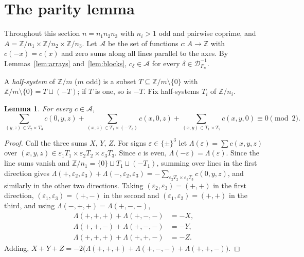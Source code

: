 \documentclass[11pt]{amsart}
\newcommand{\Z}{\mathbb{Z}}
\newcommand{\cod}[1]{\mathcal{D}_{#1}^{-1}}
\theoremstyle{plain}
\newtheorem{lemma}[theorem]{Lemma}
\theoremstyle{definition}
\begin{document}
\section{The parity lemma}\label{sec:parity}

Throughout this section $n = n_1 n_2 n_3$ with $n_i > 1$ odd and pairwise coprime, and
$A = \Z/n_1 \times \Z/n_2 \times \Z/n_3$. Let $\mathcal{A}$ be the set of functions
$c\colon A \to \Z$ with $c(-x) = c(x)$ and zero sums along all lines parallel to the axes. By
Lemmas~\ref{lem:arrays} and~\ref{lem:blocks}, $c_\delta \in \mathcal{A}$ for every
$\delta \in \cod{F_n}$.

A \emph{half-system} of $\Z/m$ ($m$ odd) is a subset $T \subseteq \Z/m \setminus \{0\}$ with
$\Z/m \setminus \{0\} = T \sqcup (-T)$; if $T$ is one, so is $-T$. Fix half-systems $T_i$ of
$\Z/n_i$.

\begin{lemma}\label{lem:identity}
For every $c \in \mathcal{A}$,
\[
  \sum_{(y,z) \in T_2 \times T_3} c(0,y,z) + \sum_{(x,z) \in T_1 \times (-T_3)} c(x,0,z)
  + \sum_{(x,y) \in T_1 \times T_2} c(x,y,0) \equiv 0 \pmod 2 .
\]
\end{lemma}

\begin{proof}
Call the three sums $X$, $Y$, $Z$. For signs $\varepsilon \in \{\pm\}^3$ let
$\Lambda(\varepsilon) = \sum c(x,y,z)$ over $(x,y,z) \in \varepsilon_1T_1 \times \varepsilon_2T_2
\times \varepsilon_3T_3$. Since $c$ is even, $\Lambda(-\varepsilon) = \Lambda(\varepsilon)$. Since
the line sums vanish and $\Z/n_1 = \{0\} \sqcup T_1 \sqcup (-T_1)$, summing over lines in the
first direction gives
$\Lambda(+,\varepsilon_2,\varepsilon_3) + \Lambda(-,\varepsilon_2,\varepsilon_3)
= -\sum_{\varepsilon_2T_2 \times \varepsilon_3T_3} c(0,y,z)$, and similarly in the other two
directions. Taking $(\varepsilon_2,\varepsilon_3) = (+,+)$ in the first direction,
$(\varepsilon_1,\varepsilon_3) = (+,-)$ in the second and $(\varepsilon_1,\varepsilon_2) = (+,+)$ in
the third, and using $\Lambda(-,+,+) = \Lambda(+,-,-)$,
\begin{align*}
  \Lambda(+,+,+) + \Lambda(+,-,-) &= -X,\\
  \Lambda(+,+,-) + \Lambda(+,-,-) &= -Y,\\
  \Lambda(+,+,+) + \Lambda(+,+,-) &= -Z.
\end{align*}
Adding, $X + Y + Z = -2\bigl(\Lambda(+,+,+) + \Lambda(+,-,-) + \Lambda(+,+,-)\bigr)$.
\end{proof}
\end{document}
